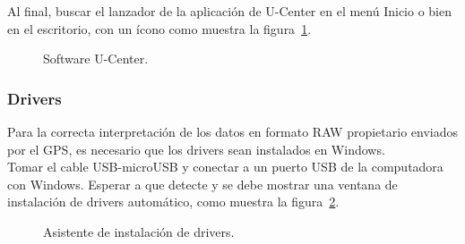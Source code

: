 \newpage

Al final, buscar el lanzador de la aplicación de U-Center en el menú Inicio o bien en el escritorio, con un ícono como muestra la figura~\ref{fig:iconoUCenter}.

\begin{figure}[H] %
\caption{Software U-Center.}
\label{fig:iconoUCenter}
\end{figure}

\subsubsection{Drivers}

Para la correcta interpretación de los datos en formato RAW propietario enviados por el GPS, es necesario que los drivers sean instalados en Windows.\\

Tomar el cable USB-microUSB y conectar a un puerto USB de la computadora con Windows. Esperar a que detecte y se debe mostrar una ventana de instalación de drivers automático, como muestra la figura~\ref{fig:asisdriv}.

\begin{figure}[H] %
\caption{Asistente de instalación de drivers.}
\label{fig:asisdriv}
\end{figure}

